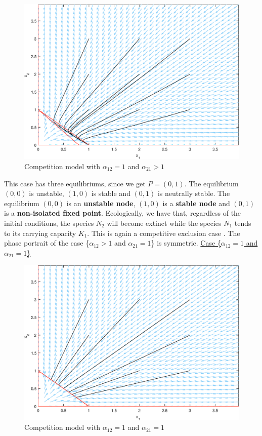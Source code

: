 \documentclass[11pt,a4paper]{scrartcl}
\theoremstyle{definition}
\begin{document}
\begin{figure}[!ht]
\centering
\includegraphics[scale=.6]{fig_5.eps}
\caption{Competition model with $\alpha_{12} = 1$ and $\alpha_{21} > 1$}
\label{figC5}
\end{figure} 

This case has three equilibriums, since we get $P=(0, 1)$. The equilibrium $(0, 0)$ is unstable, $(1, 0)$ is stable and $(0, 1)$ is neutrally stable. The equilibrium $(0, 0)$ is an \textbf{unstable node}, $(1, 0)$ is a \textbf{stable node} and $(0, 1)$ is a \textbf{non-isolated fixed point}. Ecologically, we have that, regardless of the initial conditions, the species $N_2$ will become extinct while the species $N_1$ tends to its carrying capacity $K_1$. This is again a competitive exclusion case \cite{Murray}. The phase portrait of the case \Big\{$\alpha_{12} > 1$ and $\alpha_{21} = 1$\Big\} is symmetric.
\FloatBarrier
\vspace{1em}
\underline{Case \Big\{$\alpha_{12} = 1$ and $\alpha_{21} = 1$\Big\}}\newline

\begin{figure}[!ht]
\centering
\includegraphics[scale=.6]{fig_7.eps}
\caption{Competition model with $\alpha_{12} = 1$ and $\alpha_{21} = 1$}
\label{figC7}
\end{figure} 
\end{document}
